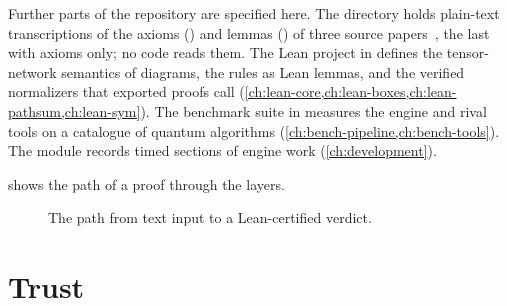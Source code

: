 Further parts of the repository are specified here. The directory  holds plain-text transcriptions of the axioms () and lemmas () of three source papers~\cite{poor2023zxw,wang2023qufinitezxw,carette2019mixed}, the last with axioms only; no code reads them. The Lean project in  defines the tensor-network semantics of diagrams, the rules as Lean lemmas, and the verified normalizers that exported proofs call (\cref{ch:lean-core,ch:lean-boxes,ch:lean-pathsum,ch:lean-sym}). The benchmark suite in  measures the engine and rival tools on a catalogue of quantum algorithms (\cref{ch:bench-pipeline,ch:bench-tools}). The module  records timed sections of engine work (\cref{ch:development}).

 shows the path of a proof through the layers.

\begin{figure}[H]
\centering
{}
\caption{The path from text input to a Lean-certified verdict.}
\label{fig:overview-flow}
\end{figure}

\section{Trust}\label{sec:overview-trust}

